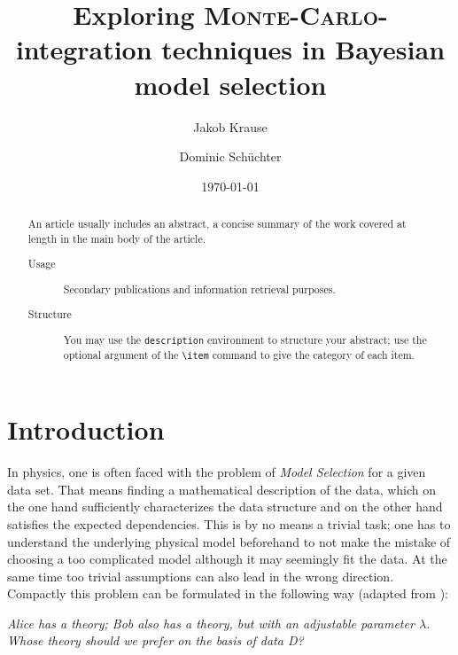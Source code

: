 \documentclass[%
 reprint,
 amsmath,amssymb,
 aps,
]{revtex4-1}
\begin{document}
\title{Exploring \textsc{Monte-Carlo}-integration techniques in Bayesian model selection}%

\author{Jakob Krause}
\author{Dominic Schüchter}

\date{\today}%

\begin{abstract}
  An article usually includes an abstract, a concise summary of the work
  covered at length in the main body of the article.
  \begin{description}
  \item[Usage]
    Secondary publications and information retrieval purposes.
  \item[Structure]
    You may use the \texttt{description} environment to structure your abstract;
    use the optional argument of the \verb+\item+ command to give the category of each item.
  \end{description}
\end{abstract}
\maketitle


\section{\label{sec:intro}Introduction}
\noindent In physics, one is often faced with the problem of \emph{Model Selection} for a given data set. That means finding a mathematical description of the data, which on the one hand sufficiently characterizes the data structure and on the other hand satisfies the expected dependencies. This is by no means a trivial task; one has to understand the underlying physical model beforehand to not make the mistake of choosing a too complicated model although it may seemingly fit the data. At the same time too trivial assumptions can also lead in the wrong direction. Compactly this problem can be formulated in the following way (adapted from \cite[Chap. 4]{sivia}):

\begin{center}
	\emph{Alice has a theory; Bob also has a theory, but with an adjustable parameter $\lambda$. Whose theory should we prefer on the basis of data D?}
\end{center}
\end{document}
